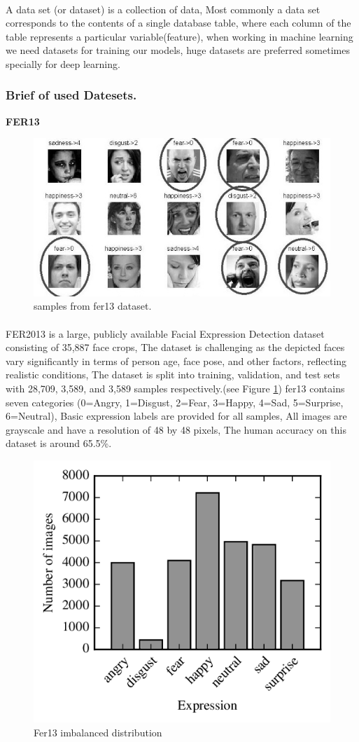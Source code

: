 \paragraph{}
A data set (or dataset) is a collection of data, Most commonly a data set corresponds to the contents of a single database table, where each column of the table represents a particular variable(feature), when working in machine learning we need datasets for training our models, huge datasets are preferred sometimes specially for deep learning.\newline
\subsubsection{Brief of used Datesets.}
\textbf{FER13}
\begin{figure}
	\centering
	\includegraphics[width=.7\textwidth]{images/fer2013.jpg}
	\caption{samples from fer13 dataset.}
\end{figure} 
\paragraph{}
FER2013 is a large, publicly available Facial Expression Detection dataset consisting of 35,887 face crops, The dataset is challenging as the depicted faces vary significantly in terms of person age, face pose, and other factors, reflecting realistic conditions, 
The dataset is split into training, validation, and test sets with 28,709, 3,589, and 3,589 samples respectively.(see Figure \ref{fig:fer13})\newline
fer13 contains seven categories (0=Angry, 1=Disgust, 2=Fear, 3=Happy, 4=Sad, 5=Surprise, 6=Neutral), Basic expression labels are provided for all samples, All images are grayscale and have a resolution of 48 by 48 pixels, The human accuracy on this dataset is around 65.5\%. 
 
\begin{figure}
	\centering
	\includegraphics[width=.5\textwidth]{images/fer_dis.png}
	\caption{Fer13 imbalanced distribution}
	\label{fig:fer13}
\end{figure} 
